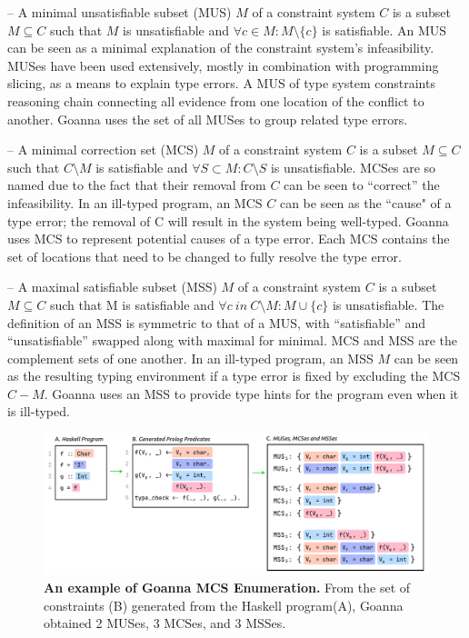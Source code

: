 \documentclass[pdflatex,sn-mathphys-num]{sn-jnl}%
\begin{document}
        
    – A minimal unsatisfiable subset (MUS) $M$ of a constraint system $C$ is a subset $M \subseteq C$ such that $M$ is unsatisfiable and $ \forall{c} \in M : M \setminus \{c\}$ is satisfiable. An MUS can be seen as a minimal explanation of the constraint system’s infeasibility. MUSes have been used extensively, mostly in combination with programming slicing, as a means to explain type errors. A MUS of type system constraints reasoning chain connecting all evidence from one location of the conflict to another. Goanna uses the set of all MUSes to group related type errors.

    – A minimal correction set (MCS) $M$ of a constraint system $C$ is a subset $M \subseteq C$ such that $C \setminus M$ is satisfiable and $\forall{S} \subset M : C \setminus S$ is unsatisfiable. MCSes are so named due to the fact that their removal from $C$ can be seen to “correct” the infeasibility. In an ill-typed program, an MCS $C$ can be seen as the ``cause" of a type error; the removal of C will result in the system being well-typed. Goanna uses MCS to represent potential causes of a type error. Each MCS contains the set of locations that need to be changed to fully resolve the type error.
    
  – A maximal satisfiable subset (MSS) $M$ of a constraint system $C$ is a subset $M \subseteq C$ such that M is satisfiable and $\forall{c}\ in\ C \setminus M:M\cup\{c\}$ is unsatisfiable. The definition of an MSS is symmetric to that of a MUS, with “satisfiable” and “unsatisfiable” swapped along with maximal for minimal. MCS and MSS are the complement sets of one another. In an ill-typed program, an MSS $M$ can be seen as the resulting typing environment if a type error is fixed by excluding the MCS $C - M$. Goanna uses an MSS to provide type hints for the program even when it is ill-typed.
  
 
     \begin{figure}[ht!]
        \centering
        \includegraphics[width=\linewidth]{images/Enumeration-Example}
        \caption[An example of Goanna MCS Enumeration]{\textbf{An example of Goanna MCS Enumeration.} From the set of constraints (B) generated from the Haskell program(A), Goanna obtained 2 MUSes, 3 MCSes, and 3 MSSes. }
        \label{fig:enumeration-example}
    \end{figure}
    
\end{document}
